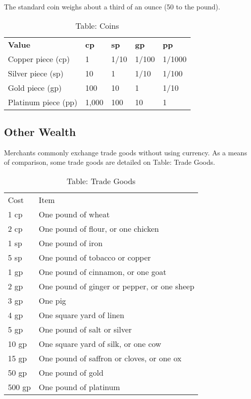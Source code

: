 The standard coin weighs about a third of an ounce (50 to the pound).

\begin{table}[]
\sffamily
\caption{Table: Coins}
\begin{tabular}{lllll}
\textbf{Value} & \textbf{cp} & \textbf{sp} & \textbf{gp} & \textbf{pp}\\
Copper piece (cp)&  1&  1/10&  1/100&  1/1000 \\
Silver piece (sp)&  10&  1&  1/10&  1/100 \\
Gold piece (gp)&  100&  10&  1&  1/10 \\
Platinum piece (pp)&  1,000&  100&  10&  1\\
\end{tabular}
\end{table}
			
\subsection{Other Wealth}

		
Merchants commonly exchange trade goods without using currency. As a means of comparison, some trade goods are detailed on Table: Trade Goods.
			
\begin{table}[]
\sffamily
\caption{Table: Trade Goods}
\begin{tabular}{ll}
Cost & Item\\
1 cp& One pound of wheat \\ 
2 cp& One pound of flour, or one chicken \\
1 sp& One pound of iron \\
5 sp& One pound of tobacco or copper \\
1 gp& One pound of cinnamon, or one goat \\
2 gp& One pound of ginger or pepper, or one sheep \\
3 gp& One pig \\
4 gp& One square yard of linen \\
5 gp& One pound of salt or silver \\
10 gp& One square yard of silk, or one cow \\
15 gp& One pound of saffron or cloves, or one ox \\
50 gp& One pound of gold \\ 
500 gp& One pound of platinum\\
\end{tabular}
\end{table}

